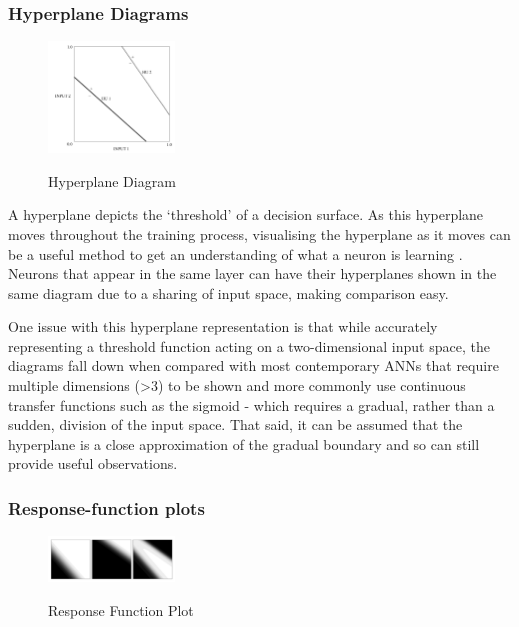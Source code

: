 \documentclass[a4paper,11pt,titlepage]{article}
\begin{document}
		\subsubsection{Hyperplane Diagrams}
 		
 	\begin{figure}[H]
    			\centering	
			{{\includegraphics[width=0.3\textwidth]
    				{img/craven_hyperplane.png} 
    			}}%
    			\caption{Hyperplane Diagram}%
    		\label{fig:bond}
	\end{figure} 
 		
		A hyperplane depicts the `threshold' of a decision surface. As this hyperplane moves throughout the training process, visualising the hyperplane as it moves can be a useful method to get an understanding of what a neuron is learning \cite{Munro1992}. Neurons that appear in the same layer can have their hyperplanes shown in the same diagram due to a sharing of input space, making comparison easy.
		\par 
		One issue with this hyperplane representation is that while accurately representing a threshold function acting on a two-dimensional input space, the diagrams fall down when compared with most contemporary ANNs that require multiple dimensions (>3) to be shown and more commonly use continuous transfer functions such as  the sigmoid - which requires a gradual, rather than a sudden, division of the input space. That said, it can be assumed that the hyperplane is a close approximation of the gradual boundary and so can still provide useful observations.
		\par 
		
		\subsubsection{Response-function plots}
		
 	\begin{figure}[H]
    			\centering	
			{{\includegraphics[width=0.3\textwidth]
    				{img/craven_gradient.png} 
    			}}%
    			\caption{Response Function Plot}%
    		\label{fig:bond}
	\end{figure} 
 		
\end{document}
